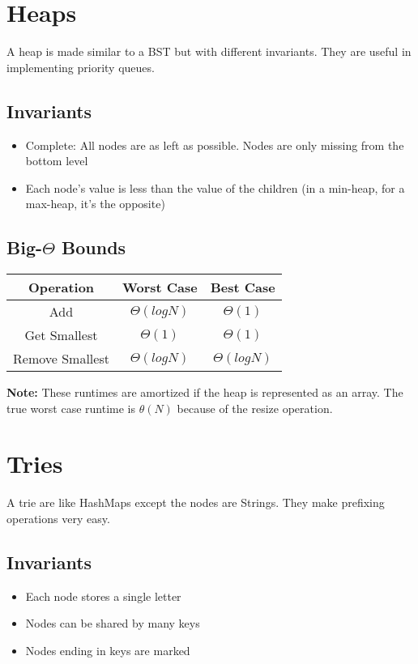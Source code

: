 \documentclass{article}
\begin{document}
\section{Heaps}
A heap is made similar to a BST but with different invariants. They are useful in implementing priority queues.
\subsection{Invariants}
\begin{itemize}
    \item Complete: All nodes are as left as possible. Nodes are only missing from the bottom level
    \item Each node's value is less than the value of the children (in a min-heap, for a max-heap, it's the opposite)
\end{itemize}
\subsection{Big-$\Theta$ Bounds}
\begin{center}
    \begin{tabular}{ c | c | c }
     Operation & Worst Case & Best Case\\
     \hline
     Add & $\Theta(log N)$ & $\Theta(1)$\\ 
     Get Smallest & $\Theta(1)$ & $\Theta(1)$\\  
     Remove Smallest & $\Theta(logN)$ & $\Theta(logN)$\\
    \end{tabular}
\end{center}
\textbf{Note:} These runtimes are amortized if the heap is represented as an array.
The true worst case runtime is $\theta(N)$ because of the resize operation.
\section{Tries}
A trie are like HashMaps except the nodes are Strings. They make prefixing operations very easy.
\subsection{Invariants}
\begin{itemize}
    \item Each node stores a single letter
    \item Nodes can be shared by many keys
    \item Nodes ending in keys are marked
\end{itemize}
\end{document}

